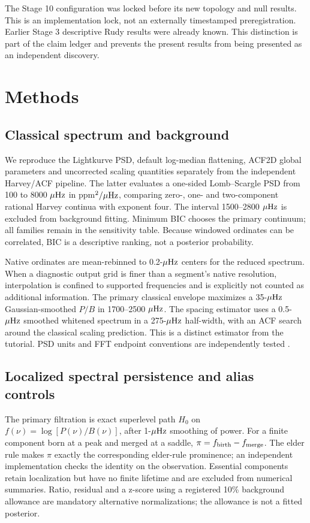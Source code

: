 \documentclass[11pt]{article}
\begin{document}
The Stage 10 configuration was locked before its new topology and null results.
This is an implementation lock, not an externally timestamped preregistration.
Earlier Stage 3 descriptive Rudy results were already known. This distinction is
part of the claim ledger and prevents the present results from being presented
as an independent discovery.

\section{Methods}
\subsection{Classical spectrum and background}
We reproduce the Lightkurve PSD, default log-median flattening, ACF2D global
parameters and uncorrected scaling quantities separately from the independent
Harvey/ACF pipeline. The latter evaluates a one-sided Lomb--Scargle PSD from
100 to 8000 $\mu{\rm Hz}$ in ppm$^2/\mu{\rm Hz}$, comparing zero-, one- and
two-component rational Harvey continua with exponent four. The interval
1500--2800 $\mu{\rm Hz}$ is excluded from background fitting. Minimum BIC chooses
the primary continuum; all families remain in the sensitivity table.
Because windowed ordinates can be correlated, BIC is a descriptive ranking,
not a posterior probability.

Native ordinates are mean-rebinned to 0.2-$\mu{\rm Hz}$ centers for the reduced
spectrum. When a diagnostic output grid is finer than a segment's native
resolution, interpolation is confined to supported frequencies and is explicitly
not counted as additional information. The primary classical envelope maximizes
a 35-$\mu{\rm Hz}$ Gaussian-smoothed $P/B$ in 1700--2500 $\mu{\rm Hz}$.
The spacing estimator uses a 0.5-$\mu{\rm Hz}$ smoothed whitened spectrum in a
275-$\mu{\rm Hz}$ half-width, with an ACF search around the classical scaling
prediction. This is a distinct estimator from the tutorial. PSD units and FFT
endpoint conventions are independently tested \citep{VanderPlas2018,Astropy2022}.

\subsection{Localized spectral persistence and alias controls}
The primary filtration is exact superlevel path $H_0$ on
$f(\nu)=\log[P(\nu)/B(\nu)]$, after 1-$\mu{\rm Hz}$ smoothing of power.
For a finite component born at a peak and merged at a saddle,
$\pi=f_{\rm birth}-f_{\rm merge}$. The elder rule makes $\pi$ exactly the
corresponding elder-rule prominence; an independent implementation checks the
identity on the observation. Essential components retain localization but have
no finite lifetime and are excluded from numerical summaries.
Ratio, residual and a z-score using a registered 10\% background allowance are
mandatory alternative normalizations; the allowance is not a fitted posterior.
\end{document}
